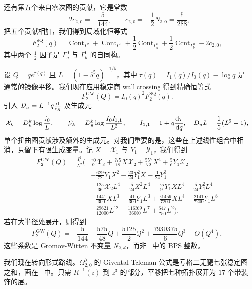 \documentclass{amsart}
\theoremstyle{definition}
\theoremstyle{remark}
\theoremstyle{plain}
\theoremstyle{definition}
\theoremstyle{remark}
\newcommand{\mc}[1]{\mathcal{#1}}
\newcommand{\mr}[1]{\mathrm{#1}}
\newcommand{\1}{\mathbf{1}}
\newcommand{\2}{\mathbf{2}}
\newcommand{\3}{\mathbf{3}}
\DeclareMathOperator{\Cont}{Cont}
\begin{document}
还有第五个来自零次图的贡献，它是常数
\[ -2c_{2,0} = -\frac{5}{144}, \qquad c_{2,0} = -\frac{1}{2}N_{2,0} = \frac{5}{288}, \]
把五个贡献相加，我们得到局域化恒等式
\[ F_2^{\mr{SQ}}(q) = \Cont_{\Gamma^2} + \Cont_{\Gamma^1} + \frac{1}{2}\Cont_{\Gamma_a^0} + \frac{1}{2}\Cont_{\Gamma_b^0} - 2c_{2,0}, \]
其中两个 \(\frac{1}{2}\) 因子是 \(\Gamma_a^0\) 与 \(\Gamma_b^0\) 的自同构。

设 \(Q = qe^{\tau(q)}\) 且 \(L = (1-5^5q)^{-1/5}\)，其中 \(\tau(q) = I_1(q)/I_0(q) - \log q\) 是通常的镜像平移。我们现在应用稳定商 wall crossing 得到精确恒等式
\[ F_2^{\mr{GW}}(Q) = I_0(q)^2 F_2^{\mr{SQ}}(q). \]
引入 \(D_u = L^{-1}q\odv{}{q}\) 及生成元
\[ \mc{X}_k = D_u^k \log \frac{I_0}{L}, \qquad \mc{Y}_k = D_u^k \log \frac{I_0I_{1,1}}{L^2}, \qquad I_{1,1} = 1 + q \odv{\tau}{q}, \quad D_u L = \frac{1}{5}(L^5-1), \]
单个扭曲图贡献涉及额外的生成元。对我们重要的是，这些在上述线性组合中相消，只留下有限生成变量。记 \(X = \mc{X}_1\) 与 \(Y_1 = \mc{Y}_1\)，我们得到
\begin{align*}
    F^{\mr{GW}}_2(Q) = \frac{I_0^2}{L^2}\Big(&\frac{70}{9}\mc{X}_3 + \frac{575}{18}X\mc{X}_2 + \frac{557}{72}X^3 + \frac{5}{6}Y_1\mc{X}_2 \\
    &- \frac{629}{72}Y_1X^2 - \frac{23}{24}Y_1^2 X - \frac{1}{24}Y_1^3 \\
    &+ \frac{125}{36}\mc{X}_2 L^4 - \frac{5}{24}X^2L^4 - \frac{35}{9}Y_1XL^4 - \frac{5}{24}Y_1^2L^4 \\
    &- \frac{1441}{300}XL^3 - \frac{41}{300}Y_1L^3 + \frac{31459}{7200}XL^8 + \frac{2141}{7200}Y_1L^8 \\
    &+ \frac{29621}{12000}L^{12} - \frac{116369}{36000}L^7 + \frac{547}{750}L^2\Big).
\end{align*}
若在大半径处展开，则得到
\[ F_2^{\mr{GW}}(Q) = -\frac{5}{144} + \frac{575}{48}Q + \frac{5125}{2}Q^2 + \frac{7930375}{6}Q^3 + O(Q^4), \]
这些系数是 Gromov-Witten 不变量 \(N_{2,d}\)，而非~ 中的 BPS 整数。

我们现在转向形式路线。\(\Omega^{\lambda}_{2,0}\) 的 Givental-Teleman 公式是亏格二无腿七张稳定图之和，画在~ 中。只需 \(R^{-1}(z)\) 到 \(z^3\) 的部分，平移把七种拓扑展开为 \(17\) 个带装饰的层。
\end{document}
